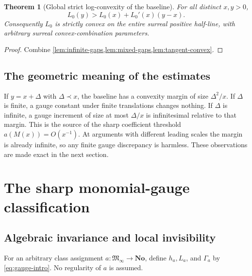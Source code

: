 \documentclass[11pt,letterpaper]{article}
\numberwithin{equation}{section}
\newtheorem{theorem}{Theorem}[section]
\theoremstyle{plain}
\theoremstyle{definition}
\theoremstyle{remark}
\newcommand{\No}{\mathbf{No}}
\newcommand{\Minf}{\mathfrak M_{\infty}}
\begin{document}
\begin{theorem}[Global strict log-convexity of the baseline]\label{thm:baseline-convex}
For all distinct $x,y>0$,
\begin{equation}\label{eq:strict-support0}
 L_0(y)>L_0(x)+L_0'(x)(y-x).
\end{equation}
Consequently $L_0$ is strictly convex on the entire surreal positive
half-line, with arbitrary surreal convex-combination parameters.
\end{theorem}
\begin{proof}
Combine \cref{lem:infinite-gaps,lem:mixed-gaps,lem:tangent-convex}.
\end{proof}

\subsection{The geometric meaning of the estimates}
If $y=x+\Delta$ with $\Delta\prec x$, the baseline has a convexity margin
of size $\Delta^2/x$. If $\Delta$ is finite, a gauge constant under finite
translations changes nothing. If $\Delta$ is infinite, a gauge increment
of size at most $\Delta/x$ is infinitesimal relative to that margin.
This is the source of the sharp coefficient threshold $a(M(x))=O(x^{-1})$.
At arguments with different leading scales the margin is already infinite,
so any finite gauge discrepancy is harmless. These observations are made
exact in the next section.

\section{The sharp monomial-gauge classification}\label{sec:gauges}

\subsection{Algebraic invariance and local invisibility}
For an arbitrary class assignment $a:\Minf\to\No$, define $h_a,L_a$,
and $\Gamma_a$ by \eqref{eq:gauge-intro}. No regularity of $a$ is assumed.
\end{document}
